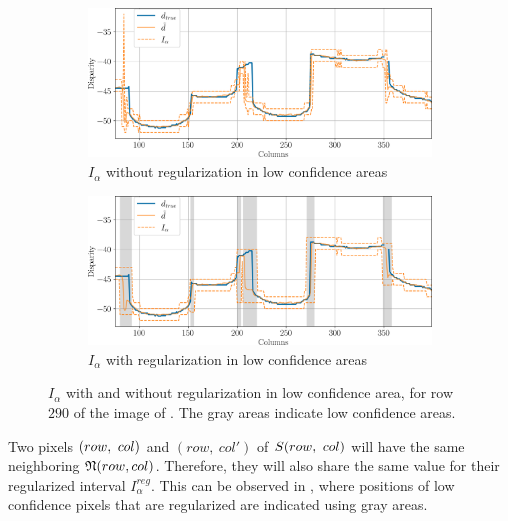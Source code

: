 \begin{figure}
    \centering
    \begin{subfigure}[t]{\linewidth}
        \centering
        \includegraphics[width=\linewidth]{Images/Chap_5/intervals_ambiguous_area_row_290_1.png}
        \caption{$I_\alpha$ without regularization in low confidence areas}
        \label{fig:intervals_ambiguous_row_290_1}
    \end{subfigure}\hfill
    \begin{subfigure}[t]{\linewidth}
        \centering
        \includegraphics[width=\linewidth]{Images/Chap_5/intervals_ambiguous_area_row_290_2.png}
        \caption{$I_\alpha$ with regularization in low confidence areas}
        \label{fig:intervals_ambiguous_row_290_2}
    \end{subfigure}
    \caption{$I_\alpha$ with and without regularization in low confidence area, for row $290$ of the image of . The gray areas indicate low confidence areas.}
    \label{fig:intervals_ambiguous_row_290}
\end{figure}

Two pixels $(row, ~col)$ and $(row,~col')$ of $S(row, ~col)$ will have the same neighboring $\mathfrak{N}(row,col)$. Therefore, they will also share the same value for their regularized interval $I^{reg}_\alpha$. This can be observed in , where positions of low confidence pixels that are regularized are indicated using gray areas. 

